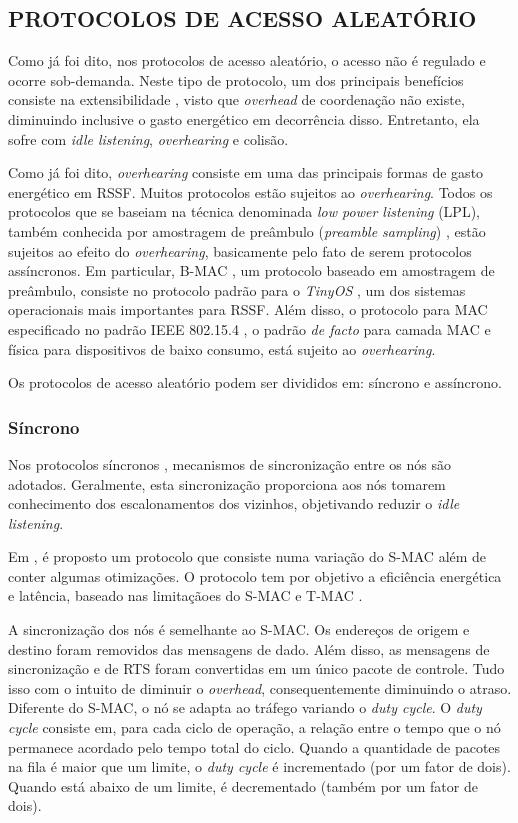 \documentclass[12pt]{article}
\begin{document}
  \subsection{PROTOCOLOS DE ACESSO ALEATÓRIO}
    Como já foi dito, nos protocolos de acesso aleatório, o acesso não é regulado e ocorre sob-demanda. Neste tipo de protocolo, um dos principais benefícios consiste na extensibilidade \cite{20100312645920}, visto que \textit{overhead} de coordenação não existe, diminuindo inclusive o gasto energético em decorrência disso. Entretanto, ela sofre com \textit{idle listening}, \textit{overhearing} e colisão.

    Como já foi dito, \emph{overhearing} consiste em uma das principais formas de gasto energético em RSSF. Muitos protocolos estão sujeitos ao \emph{overhearing}. Todos os protocolos que se baseiam na técnica denominada 
\emph{low power listening} (LPL), também conhecida por amostragem de preâmbulo (\emph{preamble sampling}) \cite{Polastre04, Hoiydi04, Buettner06, 20100312644073, 20103113115841}, estão sujeitos 
ao efeito do \emph{overhearing}, basicamente pelo fato de serem protocolos assíncronos. Em particular, B-MAC \cite{Polastre04}, um protocolo baseado em amostragem de preâmbulo, consiste 
no protocolo padrão para o \emph{TinyOS} \cite{Buettner06}, um dos sistemas operacionais mais importantes para RSSF. Além disso, o protocolo para MAC especificado no padrão IEEE 802.15.4 \cite{Society2006}, o padrão 
\emph{de facto} para camada MAC e física para dispositivos de baixo consumo, está sujeito ao \emph{overhearing}.

    Os protocolos de acesso aleatório podem ser divididos em: síncrono e assíncrono.
  
  \subsubsection{Síncrono}
    Nos protocolos síncronos  \cite{20064010146973, 20102012936055, Yadav08, 20100812725891, 20101312811704}, mecanismos de sincronização entre os nós são adotados. Geralmente, esta sincronização proporciona aos nós tomarem conhecimento dos escalonamentos dos vizinhos, objetivando reduzir o \textit{idle listening}.

    Em \cite{Yadav08}, é proposto um protocolo que consiste numa variação do S-MAC \cite{Wei02} além de conter algumas otimizações. O protocolo tem por objetivo a eficiência energética e latência, baseado nas limitaçãoes do S-MAC e T-MAC \cite{Dam03}. 

    A sincronização dos nós é semelhante ao S-MAC. Os endereços de origem e destino foram removidos das mensagens de dado. Além disso, as mensagens de sincronização e de RTS foram convertidas em um único pacote de controle. Tudo isso com o intuito de diminuir o \textit{overhead}, consequentemente diminuindo o atraso. Diferente do S-MAC, o nó se adapta ao tráfego variando o \textit{duty cycle}. 
O \emph{duty cycle} consiste em, para cada ciclo de operação, a relação entre o tempo que o nó permanece acordado pelo tempo total do ciclo. Quando a quantidade de pacotes na fila é maior que um limite, o \textit{duty cycle} é incrementado (por um fator de dois). Quando está abaixo de um limite, é decrementado (também por um fator de dois).
\end{document}

